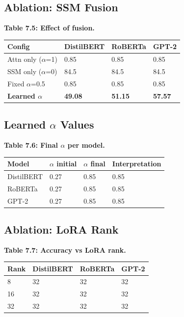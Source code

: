 \subsection{Ablation: SSM Fusion}

\textbf{Table 7.5: Effect of fusion.}

\begin{table}[H]
\centering
\small
\begin{tabular}{llll}
\toprule
\textbf{Config} & \textbf{DistilBERT} & \textbf{RoBERTa} & \textbf{GPT-2} \\
\midrule
Attn only ($\alpha$=1) & 0.85 & 0.85 & 0.85 \\
SSM only ($\alpha$=0) & 84.5 & 84.5 & 84.5 \\
Fixed $\alpha$=0.5 & 0.85 & 0.85 & 0.85 \\
\textbf{Learned $\alpha$} & \textbf{49.08} & \textbf{51.15} & \textbf{57.57} \\
\bottomrule
\end{tabular}
\end{table}

\subsection{Learned $\alpha$ Values}

\textbf{Table 7.6: Final $\alpha$ per model.}

\begin{table}[H]
\centering
\small
\begin{tabular}{llll}
\toprule
\textbf{Model} & \textbf{$\alpha$ initial} & \textbf{$\alpha$ final} & \textbf{Interpretation} \\
\midrule
DistilBERT & 0.27 & 0.85 & 0.85 \\
RoBERTa & 0.27 & 0.85 & 0.85 \\
GPT-2 & 0.27 & 0.85 & 0.85 \\
\bottomrule
\end{tabular}
\end{table}

\subsection{Ablation: LoRA Rank}

\textbf{Table 7.7: Accuracy vs LoRA rank.}

\begin{table}[H]
\centering
\small
\begin{tabular}{llll}
\toprule
\textbf{Rank} & \textbf{DistilBERT} & \textbf{RoBERTa} & \textbf{GPT-2} \\
\midrule
8 & 32 & 32 & 32 \\
16 & 32 & 32 & 32 \\
32 & 32 & 32 & 32 \\
\bottomrule
\end{tabular}
\end{table}

